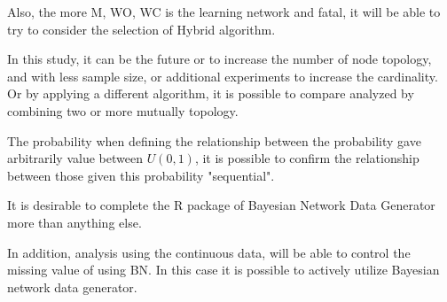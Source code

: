 Also, the more M, WO, WC is the learning network and fatal, it will be able to try to consider the selection of Hybrid algorithm.

In this study, it can be the future or to increase the number of node topology, and with less sample size, or additional experiments to increase the cardinality. Or by applying a different algorithm, it is possible to compare analyzed by combining two or more mutually topology.

The probability when defining the relationship between the probability gave arbitrarily value between $U(0,1)$, it is possible to confirm the relationship between those given this probability "sequential".

It is desirable to complete the R package of Bayesian Network Data Generator more than anything else.

In addition, analysis using the continuous data, will be able to control the missing value of using BN. In this case it is possible to actively utilize Bayesian network data generator.